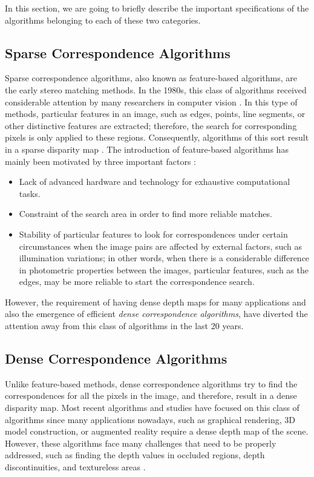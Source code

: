 In this section, we are going to briefly describe the important specifications of the algorithms belonging to each of these two categories.
\subsection{Sparse Correspondence Algorithms}
Sparse correspondence algorithms, also known as feature-based algorithms, are the early stereo matching methods. In the 1980s, this class of algorithms received considerable attention by
many researchers in computer vision \cite{dhon89}.
In this type of methods, particular features in an image, such as edges, 
points, line segments, or other distinctive features are extracted; therefore, the search for corresponding pixels is only applied to these regions. 
Consequently, algorithms of this
sort result in a sparse disparity map \cite{matt89,hsie92, sze11}. The introduction of feature-based algorithms has mainly been motivated by three important factors \cite{bro03,sze11}:
\begin{itemize}
\item Lack of advanced hardware and technology for exhaustive computational tasks.
\item Constraint of the search area in order to find more reliable matches.
\item Stability of particular features to look for correspondences under certain circumstances when the image pairs are affected by external factors, 
such as illumination variations; in other words, when there is a considerable difference in photometric properties between the images, 
particular features, such as the edges, may be more reliable to start the correspondence search.
\end{itemize}

However, the requirement of having dense depth maps for many applications and also the emergence of efficient {\it dense correspondence algorithms}, have diverted the attention away
from this class of algorithms in the last 20 years.

\subsection{Dense Correspondence Algorithms}
Unlike feature-based methods, dense correspondence algorithms try to find the
correspondences for all the pixels in the image, and therefore, result in a dense disparity map. Most recent algorithms and studies have focused on this class of algorithms since many applications 
nowadays, such as graphical rendering, 3D model construction, or augmented reality require a dense depth map of the scene. 
However, these algorithms face many challenges that need to be properly
addressed, such as finding the depth values in occluded regions, depth discontinuities, and textureless areas \cite{sch02,bro03}.

